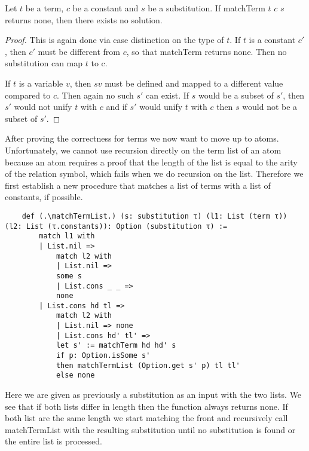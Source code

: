 \begin{lemma}[\matchTermNoneImpNoSolution]
    Let $t$ be a term, $c$ be a constant and $s$ be a substitution. If matchTerm $t$ $c$ $s$ returns none, then there exists no solution.
\end{lemma}
\begin{proof}
This is again done via case distinction on the type of $t$. If $t$ is a constant $c'$, then $c'$ must be different from $c$, so that matchTerm returns none. Then no substitution can map $t$ to c.

If $t$ is a variable $v$, then $s v$ must be defined and mapped to a different value compared to $c$. Then again no such $s'$ can exist. If $s$ would be a subset of $s'$, then $s'$ would not unify $t$ with $c$ and if $s'$ would unify $t$ with $c$ then $s$ would not be a subset of $s'$.
\end{proof}

After proving the correctness for terms we now want to move up to atoms. Unfortunately, we cannot use recursion directly on the term list of an atom because an atom requires a proof that the length of the list is equal to the arity of the relation symbol, which fails when we do recursion on the list. Therefore we first establish a new procedure that matches a list of terms with a list of constants, if possible.

\begin{lstlisting}
    def (.\matchTermList.) (s: substitution τ) (l1: List (term τ)) (l2: List (τ.constants)): Option (substitution τ) :=
        match l1 with
        | List.nil =>
            match l2 with
            | List.nil =>
            some s
            | List.cons _ _ =>
            none
        | List.cons hd tl =>
            match l2 with
            | List.nil => none
            | List.cons hd' tl' =>
            let s' := matchTerm hd hd' s
            if p: Option.isSome s'
            then matchTermList (Option.get s' p) tl tl'
            else none
\end{lstlisting}

Here we are given as previously a substitution as an input with the two lists. We see that if both lists differ in length then the function always returns none.
If both list are the same length we start matching the front and recursively call matchTermList with the resulting substitution until no substitution is found or the entire list is processed.

